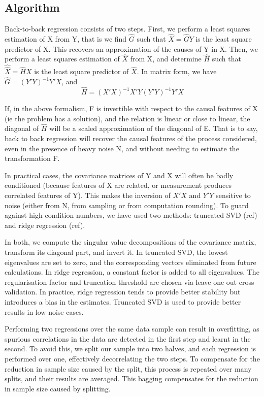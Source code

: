 \documentclass{article}
\begin{document}
\subsection{Algorithm}

Back-to-back regression consists of two steps.
%
First, we perform a least squares estimation of X from Y, that is we find $\hat G$ such that $\hat X=\hat G Y$ is the least square predictor of X.
%
This recovers an approximation of the causes of Y in X.
%
Then, we perform a least squares estimation of $\hat X$ from X, and determine $\hat H$ such that $\hat {\hat X}=\hat H X$ is the least square predictor of $\hat X$.
%
In matrix form, we have $\hat G=(Y'Y)^{-1} Y'X$, and
\begin{equation} \hat H=(X'X)^{-1} X'Y(Y'Y)^{-1} Y'X\end{equation}

If, in the above formalism, F is invertible with respect to the causal features of X (ie the problem has a solution), and the relation is linear or close to linear, the diagonal of $\hat H$ will be a scaled approximation of the diagonal of E. That is to say, back to back regression will recover the causal features of the process considered, even in the presence of heavy noise N, and without needing to estimate the transformation F.
 
In practical cases, the covariance matrices of Y and X will often be badly conditioned (because features of X are related, or measurement produces correlated features of Y). This makes the inversion of $X'X$ and $Y'Y$ sensitive to noise (either from N, from sampling or from computation rounding). To guard against high condition numbers, we have used two methods: truncated SVD (ref) and ridge regression (ref). 

In both, we compute the singular value decompositions of the covariance matrix, transform its diagonal part, and invert it. In truncated SVD, the lowest eigenvalues are set to zero, and the corresponding vectors eliminated from future calculations. In ridge regression, a constant factor is added to all eigenvalues. The regularisation factor and truncation threshold are chosen via leave one out cross validation. In practice, ridge regression tends to provide better stability but introduces a bias in the estimates. Truncated SVD is used to provide better results in low noise cases.

Performing two regressions over the same data sample can result in overfitting, as spurious correlations in the data are detected in the first step and learnt in the second. To avoid this, we split our sample into two halves, and each regression is performed over one, effectively decorrelating the two steps.
%
To compensate for the reduction in sample size caused by the split, this process is repeated over many splits, and their results are averaged.
This bagging compensates for the reduction in sample size caused by splitting.
\end{document}

